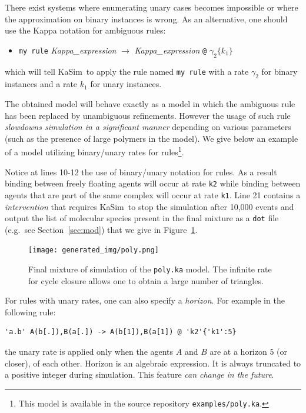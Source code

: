 \documentclass[11pt]{book}
\def\KaSim{\textsf{KaSim}}
\def\ttt#1{\texttt{#1}}
\def\rar{\rightarrow}
\def\ga{\gamma}
\def\eg{e.g.~}
\def\ITE#1{\begin{itemize}#1\end{itemize}}
\begin{document}
There exist systems where enumerating unary cases becomes impossible
or where the approximation on binary instances is wrong. As an
alternative, one should use the Kappa notation for ambiguous rules:
\ITE{
\item[] \ttt{{\textquotesingle}my rule{\textquotesingle}} {\it
  Kappa\_expression} $\rar$ {\it Kappa\_expression} \ttt{@} $\ga_2
  \{k_1\}$ } which will tell \KaSim~to apply the rule named
\ttt{{\textquotesingle}my rule{\textquotesingle}} with a rate $\ga_2$
for binary instances and a rate $k_1$ for unary instances.

The obtained model will behave exactly as a model in which the
ambiguous rule has been replaced by unambiguous refinements. However
the usage of such rule \emph{slowdowns simulation in a significant
  manner} depending on various parameters (such as the presence of
large polymers in the model). We give below an example of a model
utilizing binary/unary rates for rules\footnote{This model is
  available in the source repository \ttt{examples/poly.ka}.}.



Notice at lines 10-12 the use of binary/unary notation for rules. As a
result binding between freely floating agents will occur at rate
\ttt{{\textquotesingle}k2{\textquotesingle}} while binding between
agents that are part of the same complex will occur at rate
\ttt{{\textquotesingle}k1{\textquotesingle}}. Line 21 contains a
\emph{intervention} that requires \KaSim~to stop the simulation after
10,000 events and output the list of molecular species present in the
final mixture as a \texttt{dot} file ({\eg}see Section~\ref{sec:mod})
that we give in Figure~\ref{fig:species}.

\begin{figure}[htbp]
\begin{center}
\texttt{[image: generated\_img/poly.png]}
\caption{Final mixture %
  of simulation of the \ttt{poly.ka} model. The infinite rate for
  cycle closure allows one to obtain a large number of triangles.}
\label{fig:species}
\end{center}
\end{figure}

For rules with unary rates, one can also specify a \emph{horizon}.
For example in the following rule:
\begin{lstlisting}[language=kappa]
'a.b' A(b[.]),B(a[.]) -> A(b[1]),B(a[1]) @ 'k2'{'k1':5}
\end{lstlisting}
the unary rate is applied only when the agents $A$ and $B$ are at a
horizon $5$ (or closer), of each other. Horizon is an algebraic
expression. It is always truncated to a positive integer during
simulation.  This feature \emph{can change in the future}.
\end{document}
